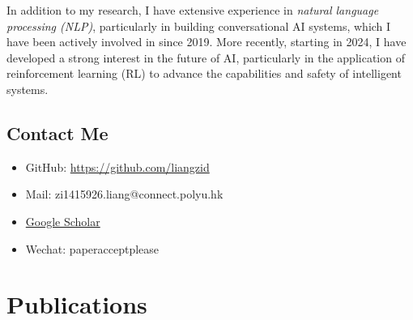 \documentclass[11pt]{article}
\begin{document}
In addition to my research, I have extensive experience in \emph{natural language processing (NLP)}, particularly in building conversational AI systems, which I have been actively involved in since 2019. More recently, starting in 2024, I have developed a strong interest in the future of AI, particularly in the application of reinforcement learning (RL) to advance the capabilities and safety of intelligent systems.
\subsection{Contact Me}
\label{sec:org2e49096}
\begin{itemize}
\item GitHub: \url{https://github.com/liangzid}
\item Mail: zi1415926.liang@connect.polyu.hk
\item \href{https://scholar.google.com/citations?user=pzrGwvMAAAAJ\&hl=zh-CN}{Google Scholar}
\item Wechat: paperacceptplease
\end{itemize}
\section{Publications}
\label{sec:org67d53e6}
\end{document}
